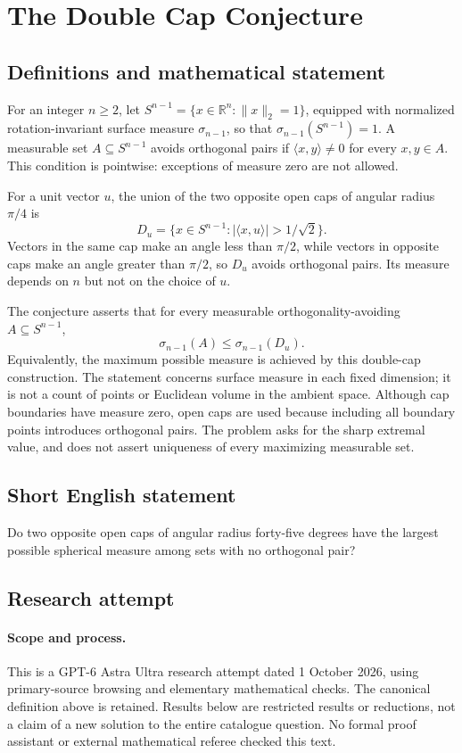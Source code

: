 \documentclass[11pt,a4paper]{article}
\begin{document}
\section*{The Double Cap Conjecture}\label{statement}

\subsection{Definitions and mathematical statement}
For an integer $n\ge2$, let
$S^{n-1}=\{x\in\mathbb R^n:\|x\|_2=1\}$, equipped with normalized
rotation-invariant surface measure $\sigma_{n-1}$, so that
$\sigma_{n-1}(S^{n-1})=1$. A measurable set $A\subseteq S^{n-1}$ avoids
orthogonal pairs if $\langle x,y\rangle\ne0$ for every $x,y\in A$.
This condition is pointwise: exceptions of measure zero are not allowed.

For a unit vector $u$, the union of the two opposite open caps of angular
radius $\pi/4$ is
\[
 D_u=\{x\in S^{n-1}:|\langle x,u\rangle|>1/\sqrt2\}.
\]
Vectors in the same cap make an angle less than $\pi/2$, while vectors
in opposite caps make an angle greater than $\pi/2$, so $D_u$ avoids
orthogonal pairs. Its measure depends on $n$ but not on the choice of $u$.

The conjecture asserts that for every measurable orthogonality-avoiding
$A\subseteq S^{n-1}$,
\[
 \sigma_{n-1}(A)\le\sigma_{n-1}(D_u).
\]
Equivalently, the maximum possible measure is achieved by this double-cap
construction. The statement concerns surface measure in each fixed
dimension; it is not a count of points or Euclidean volume in the ambient
space. Although cap boundaries have measure zero, open caps are used because
including all boundary points introduces orthogonal pairs. The problem
asks for the sharp extremal value, and does not assert uniqueness of every
maximizing measurable set.
\subsection{Short English statement}
Do two opposite open caps of angular radius forty-five degrees have the largest possible spherical measure among sets with no orthogonal pair?
\subsection{Research attempt}
\paragraph{Scope and process.}
This is a GPT-6 Astra Ultra research attempt dated 1 October 2026, using
primary-source browsing and elementary mathematical checks. The canonical
definition above is retained. Results below are restricted results or
reductions, not a claim of a new solution to the entire catalogue question.
No formal proof assistant or external mathematical referee checked this text.
\end{document}
